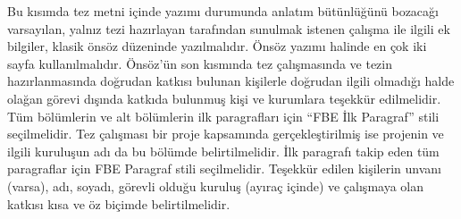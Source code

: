 Bu kısımda tez metni içinde yazımı durumunda anlatım bütünlüğünü bozacağı varsayılan, yalnız tezi hazırlayan tarafından sunulmak istenen çalışma ile ilgili ek bilgiler, klasik önsöz düzeninde yazılmalıdır. Önsöz yazımı halinde en çok iki sayfa kullanılmalıdır. Önsöz’ün son kısmında tez çalışmasında ve tezin hazırlanmasında doğrudan katkısı bulunan kişilerle doğrudan ilgili olmadığı halde olağan görevi dışında katkıda bulunmuş kişi ve kurumlara teşekkür edilmelidir. Tüm bölümlerin ve alt bölümlerin ilk paragrafları için “FBE İlk Paragraf” stili seçilmelidir.
Tez çalışması bir proje kapsamında gerçekleştirilmiş ise projenin ve ilgili kuruluşun adı da bu bölümde belirtilmelidir. İlk paragrafı takip eden tüm paragraflar için FBE Paragraf stili seçilmelidir.
Teşekkür edilen kişilerin unvanı (varsa), adı, soyadı, görevli olduğu kuruluş (ayıraç içinde) ve çalışmaya olan katkısı kısa ve öz biçimde belirtilmelidir.
